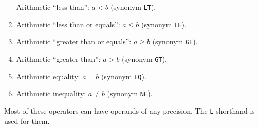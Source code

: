 \begin{enumerate}
Arithmetic ``less than'': $a<b$ (synonym \verb|LT|).
\item {}
\newline
Arithmetic ``less than or equals'': $a\leq b$ (synonym \verb|LE|).
\item {}\newline
Arithmetic ``greater than or equals'': $a\geq b$ (synonym \verb|GE|).
\item {}\newline
Arithmetic ``greater than'': $a>b$ (synonym \verb|GT|).
\item {}\newline
Arithmetic equality: $a=b$ (synonym \verb|EQ|).
\item {}\newline
Arithmetic inequality: $a\neq b$ (synonym \verb|NE|).
\end{enumerate}

Most of these operators can have operands of any precision. The
\verb|L| shorthand is used for them.

